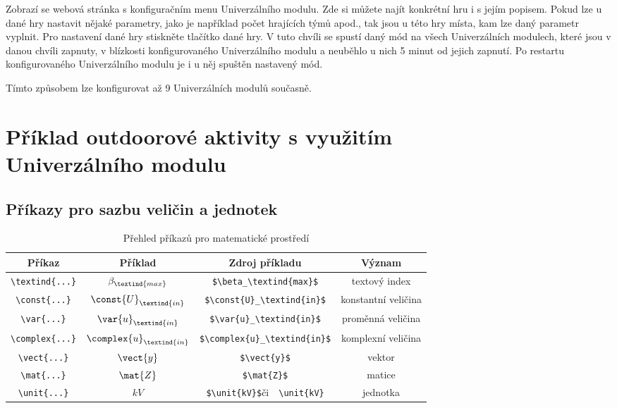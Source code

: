 Zobrazí se webová stránka s konfiguračním menu Univerzálního modulu. Zde si můžete najít konkrétní hru i s jejím popisem. Pokud lze u dané hry nastavit nějaké parametry, jako je například počet hrajících týmů apod., tak 
jsou u této hry místa, kam lze daný parametr vyplnit. Pro nastavení dané hry stiskněte tlačítko dané hry. V tuto chvíli se spustí daný mód na všech Univerzálních modulech, 
které jsou v danou chvíli zapnuty, v blízkosti konfigurovaného Univerzálního modulu a neuběhlo u nich 5 minut od jejich zapnutí. Po restartu konfigurovaného Univerzálního modulu je i u něj spuštěn nastavený mód. 

Tímto způsobem lze konfigurovat až 9 Univerzálních modulů současně. 

\chapter{Příklad outdoorové aktivity s využitím \\Univerzálního modulu}


\iffalse
\section{Příkazy pro sazbu veličin a jednotek}

\begin{table}[!h]
  \caption[Přehled příkazů]{Přehled příkazů pro matematické prostředí }
  \begin{center}
  	\small
	  \begin{tabular}{|c|c|c|c|}
	    \hline
	    Příkaz    						& Příklad 					& Zdroj příkladu  							& Význam  \\
	    \hline\hline
	    \verb|\textind{...}|	& $\beta_\textind{max}$ 	& \verb|$\beta_\textind{max}$|	& textový index \\
	    \hline
	    \verb|\const{...}| 		& $\const{U}_\textind{in}$ 				& \verb|$\const{U}_\textind{in}$|		& konstantní veličina \\
	    \hline
	    \verb|\var{...}| 		& $\var{u}_\textind{in}$ & \verb|$\var{u}_\textind{in}$| & proměnná veličina \\
	    \hline
	    \verb|\complex{...}| 	& $\complex{u}_\textind{in}$ & \verb|$\complex{u}_\textind{in}$| & komplexní veličina \\
	    \hline
	    \verb|\vect{...}| 		& $\vect{y}$ 						& \verb|$\vect{y}$| & vektor \\
	    \hline
	    \verb|\mat{...}| 	& $\mat{Z}$ 						& \verb|$\mat{Z}$| & matice \\
	    \hline
	    \verb|\unit{...}| 		& $\unit{kV}$ 						& \verb|$\unit{kV}$|\quad či\ \, \verb|\unit{kV}| & jednotka \\
	    \hline
	  \end{tabular}
  \end{center}
\end{table}



